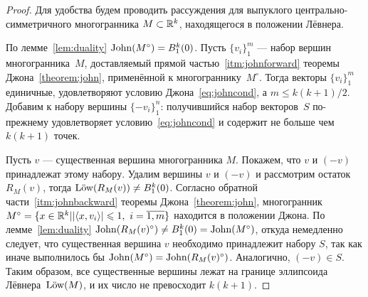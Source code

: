 \documentclass[a4paper,12pt]{article}
\def\low{\text{\rm L\"ow}}
\def\john{\mathbf{\rm John}}
\newcommand{\lb}[1]{#1\nobreak\discretionary{}{\hbox{\ensuremath{#1}}}{}}
\numberwithin{equation}{section}
\begin{document}
	\begin{proof}
		Для удобства будем проводить рассуждения для выпуклого центрально-симметричного многогранника $M\subset\mathbb {R}^k$, находящегося в положении Лёвнера.

		По лемме~\ref{lem:duality} $\john(M^{\circ})=B^k_1(0)$. Пусть $\{v_i\}_1^m$ --- набор вершин многогранника~$M$, доставляемый прямой частью~\ref{itm:johnforward} теоремы Джона~\ref{theorem:john}, применённой к многограннику~$M^{\circ}$. Тогда векторы $\{v_i\}_1^m$ единичные, удовлетворяют условию Джона~\eqref{eq:johncond}, а $m\leqslant k(k+1)/2$. Добавим к набору вершины $\{-v_i\}_1^n$: получившийся набор векторов~$S$ по-прежнему удовлетворяет условию~\eqref{eq:johncond} и содержит не больше чем $k(k+1)$ точек.

		Пусть $v$ --- существенная вершина многогранника $M$. Покажем, что $v$ и $(-v)$ принадлежат этому набору. Удалим вершины $v$ и $(-v)$ и рассмотрим остаток $R_M(v)$, тогда $\low(R_M(v))\lb\neq B^k_1(0)$. Согласно обратной части~\ref{itm:johnbackward} теоремы Джона~\ref{theorem:john}, многогранник $M^{\circ}\lb=\{x\lb\in\RR^k||\langle x, v_i\rangle|\leqslant 1,\ i=\overline{1,m}\}$ находится в положении Джона. По лемме~\ref{lem:duality} $\john(R_M(v)^{\circ})\neq B^k_1(0)=\john(M^{\circ})$, откуда немедленно следует, что существенная вершина $v$ необходимо принадлежит набору $S$, так как иначе выполнилось бы $\john(M^{\circ})=\john(R_M(v)^{\circ})$. Аналогично, $(-v)\in S$. Таким образом, все существенные вершины лежат на границе эллипсоида Лёвнера~$\low(M)$, и их число не превосходит $k(k+1)$.
	\end{proof}
\end{document}
